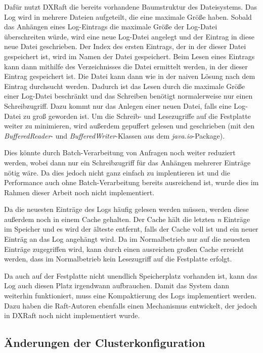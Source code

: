 Dafür nutzt DXRaft die bereits vorhandene Baumstruktur des Dateisystems. Das Log wird in mehrere Dateien aufgeteilt, die eine maximale Größe haben. Sobald das Anhängen eines Log-Eintrags die maximale Größe der Log-Datei überschreiten würde, wird eine neue Log-Datei angelegt und der Eintrag in diese neue Datei geschrieben. Der Index des ersten Eintrags, der in der dieser Datei gespeichert ist, wird im Namen der Datei gespeichert. Beim Lesen eines Eintrags kann dann mithilfe des Verzeichnisses die Datei ermittelt werden, in der dieser Eintrag gespeichert ist. Die Datei kann dann wie in der naiven Lösung nach dem Eintrag durchsucht werden. Dadurch ist das Lesen durch die maximale Größe einer Log-Datei beschränkt und das Schreiben benötigt normalerweise nur einen Schreibzugriff. Dazu kommt nur das Anlegen einer neuen Datei, falls eine Log-Datei zu groß geworden ist. Um die Schreib- und Lesezugriffe auf die Festplatte weiter zu minimieren, wird außerdem gepuffert gelesen und geschrieben (mit den \textit{BufferedReader}- und \textit{BufferedWriter}-Klassen aus dem \textit{java.io}-Package).
		
Dies könnte durch Batch-Verarbeitung von Anfragen noch weiter reduziert werden, wobei dann nur ein Schreibzugriff für das Anhängen mehrerer Einträge nötig wäre. Da dies jedoch nicht ganz einfach zu implentieren ist und die Performance auch ohne Batch-Verarbeitung bereits ausreichend ist, wurde dies im Rahmen dieser Arbeit noch nicht implementiert.

Da die neuesten Einträge des Logs häufig gelesen werden müssen, werden diese außerdem noch in einem Cache gehalten. Der Cache hält die letzten \textit{n} Einträge im Speicher und es wird der älteste entfernt, falls der Cache voll ist und ein neuer Einträg an das Log angehängt wird. Da im Normalbetrieb nur auf die neuesten Einträge zugegriffen wird, kann durch einen ausreichen großen Cache erreicht werden, dass im Normalbetrieb kein Lesezugriff auf die Festplatte erfolgt.

Da auch auf der Festplatte nicht unendlich Speicherplatz vorhanden ist, kann das Log auch diesen Platz irgendwann aufbrauchen. Damit das System dann weiterhin funktioniert, muss eine Kompaktierung des Logs implementiert werden. Dazu haben die Raft-Autoren ebenfalls einen Mechanismus entwickelt, der jedoch in DXRaft noch nicht implementiert wurde.

\subsection{Änderungen der Clusterkonfiguration}
\label{config-change}

